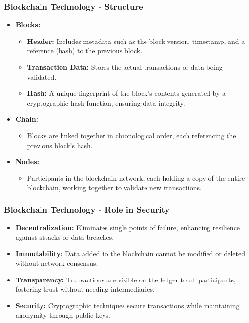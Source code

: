 \documentclass{beamer}
\begin{document}
\begin{frame}[fragile]
    \frametitle{Blockchain Technology - Structure}
    \begin{itemize}
        \item \textbf{Blocks:}
        \begin{itemize}
            \item \textbf{Header:} Includes metadata such as the block version, timestamp, and a reference (hash) to the previous block.
            \item \textbf{Transaction Data:} Stores the actual transactions or data being validated.
            \item \textbf{Hash:} A unique fingerprint of the block's contents generated by a cryptographic hash function, ensuring data integrity.
        \end{itemize}
        
        \item \textbf{Chain:}
        \begin{itemize}
            \item Blocks are linked together in chronological order, each referencing the previous block's hash.
        \end{itemize}
        
        \item \textbf{Nodes:}
        \begin{itemize}
            \item Participants in the blockchain network, each holding a copy of the entire blockchain, working together to validate new transactions.
        \end{itemize}
    \end{itemize}
\end{frame}

\begin{frame}[fragile]
    \frametitle{Blockchain Technology - Role in Security}
    \begin{itemize}
        \item \textbf{Decentralization:} Eliminates single points of failure, enhancing resilience against attacks or data breaches.
        
        \item \textbf{Immutability:} Data added to the blockchain cannot be modified or deleted without network consensus.
        
        \item \textbf{Transparency:} Transactions are visible on the ledger to all participants, fostering trust without needing intermediaries.
        
        \item \textbf{Security:} Cryptographic techniques secure transactions while maintaining anonymity through public keys.
    \end{itemize}
\end{frame}
\end{document}
